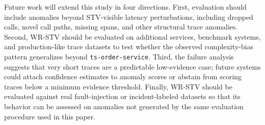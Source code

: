 Future work will extend this study in four directions. First, evaluation
should include anomalies beyond STV-visible latency perturbations,
including dropped calls, novel call paths, missing spans, and other
structural trace anomalies. Second, WR-STV should be evaluated on
additional services, benchmark systems, and production-like trace
datasets to test whether the observed complexity-bias pattern
generalizes beyond \texttt{ts-order-service}. Third, the failure analysis
suggests that very short traces are a predictable low-evidence case;
future systems could attach confidence estimates to anomaly scores or
abstain from scoring traces below a minimum evidence threshold. Finally,
WR-STV should be evaluated against real fault-injection or incident-labeled
datasets so that its behavior can be assessed on anomalies not generated
by the same evaluation procedure used in this paper.